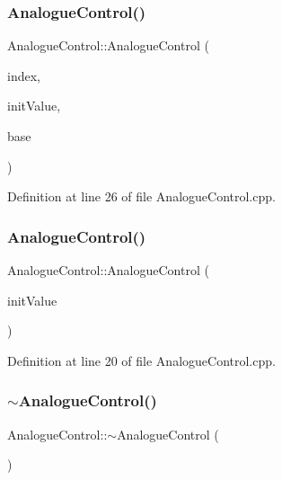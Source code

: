 \subsubsection{\texorpdfstring{Analogue\+Control()}{AnalogueControl()}\hspace{0.1cm}{\footnotesize\ttfamily [2/3]}}
{\footnotesize\ttfamily Analogue\+Control\+::\+Analogue\+Control (\begin{DoxyParamCaption}\item[{unsigned char}]{index,  }\item[{unsigned char}]{init\+Value,  }\item[{\hyperlink{class_analogue_control_base}{Analogue\+Control\+Base} $\ast$}]{base }\end{DoxyParamCaption})}



Definition at line 26 of file Analogue\+Control.\+cpp.

\mbox{\label{class_analogue_control_af5c00f8da0a5b050a6552e4d111bfe39}} 
\subsubsection{\texorpdfstring{Analogue\+Control()}{AnalogueControl()}\hspace{0.1cm}{\footnotesize\ttfamily [3/3]}}
{\footnotesize\ttfamily Analogue\+Control\+::\+Analogue\+Control (\begin{DoxyParamCaption}\item[{unsigned char}]{init\+Value }\end{DoxyParamCaption})}



Definition at line 20 of file Analogue\+Control.\+cpp.

\mbox{\label{class_analogue_control_a08a12843e8a0a1cb8a0ef9da3865a453}} 
\subsubsection{\texorpdfstring{$\sim$\+Analogue\+Control()}{~AnalogueControl()}}
{\footnotesize\ttfamily Analogue\+Control\+::$\sim$\+Analogue\+Control (\begin{DoxyParamCaption}{ }\end{DoxyParamCaption})}



